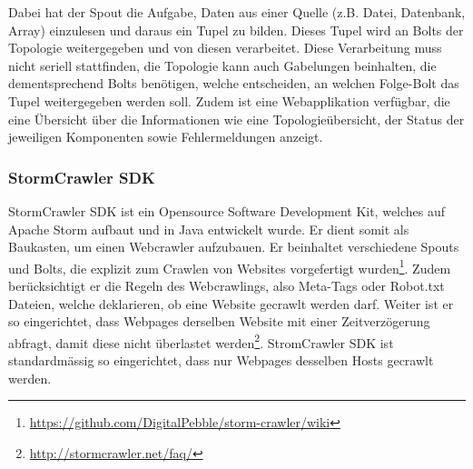 Dabei hat der Spout die Aufgabe, Daten aus einer Quelle (z.B. Datei, Datenbank, Array) einzulesen und daraus ein Tupel zu bilden.
Dieses Tupel wird an Bolts der Topologie weitergegeben und von diesen verarbeitet.
Diese Verarbeitung muss nicht seriell stattfinden, die Topologie kann auch Gabelungen beinhalten, die dementsprechend Bolts benötigen, welche entscheiden, an welchen Folge-Bolt das Tupel weitergegeben werden soll.
Zudem ist eine Webapplikation verfügbar, die eine Übersicht über die Informationen wie eine Topologieübersicht, der Status der jeweiligen Komponenten sowie Fehlermeldungen anzeigt.
\subsubsection{StormCrawler SDK}
StormCrawler SDK ist ein Opensource Software Development Kit, welches auf Apache Storm aufbaut und in Java entwickelt wurde.
Er dient somit als Baukasten, um einen Webcrawler aufzubauen.
Er beinhaltet verschiedene Spouts und Bolts, die explizit zum Crawlen von Websites vorgefertigt wurden\footnote{\url{https://github.com/DigitalPebble/storm-crawler/wiki}}.
Zudem berücksichtigt er die Regeln des Webcrawlings, also Meta-Tags oder Robot.txt Dateien, welche deklarieren, ob eine Website gecrawlt werden darf.
Weiter ist er so eingerichtet, dass Webpages derselben Website mit einer Zeitverzögerung abfragt, damit diese nicht überlastet werden\footnote{\url{http://stormcrawler.net/faq/}}.
StromCrawler SDK ist standardmässig so eingerichtet, dass nur Webpages desselben Hosts gecrawlt werden.
